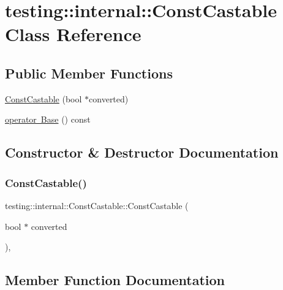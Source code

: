 \hypertarget{classtesting_1_1internal_1_1ConstCastable}{}\section{testing\+::internal\+::Const\+Castable Class Reference}
\label{classtesting_1_1internal_1_1ConstCastable}
\subsection*{Public Member Functions}
\begin{DoxyCompactItemize}
\item 
\mbox{\hyperlink{classtesting_1_1internal_1_1ConstCastable_a78eba470cc71528237a33a10a92fba7e}{Const\+Castable}} (bool $\ast$converted)
\item 
\mbox{\hyperlink{classtesting_1_1internal_1_1ConstCastable_af084893d6786010022297b1e88f4743b}{operator Base}} () const
\end{DoxyCompactItemize}


\subsection{Constructor \& Destructor Documentation}
\mbox{\label{classtesting_1_1internal_1_1ConstCastable_a78eba470cc71528237a33a10a92fba7e}} 
\subsubsection{\texorpdfstring{ConstCastable()}{ConstCastable()}}
{\footnotesize\ttfamily testing\+::internal\+::\+Const\+Castable\+::\+Const\+Castable (\begin{DoxyParamCaption}\item[{bool $\ast$}]{converted }\end{DoxyParamCaption})\hspace{0.3cm}{\ttfamily [inline]}, {\ttfamily [explicit]}}



\subsection{Member Function Documentation}
\mbox{\label{classtesting_1_1internal_1_1ConstCastable_af084893d6786010022297b1e88f4743b}} 
